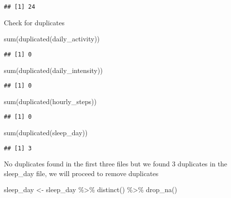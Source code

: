 \documentclass[
]{article}
\newenvironment{Shaded}{\begin{snugshade}}{\end{snugshade}}
\newcommand{\FunctionTok}[1]{\textcolor[rgb]{0.00,0.00,0.00}{#1}}
\newcommand{\NormalTok}[1]{#1}
\newcommand{\OtherTok}[1]{\textcolor[rgb]{0.56,0.35,0.01}{#1}}
\newcommand{\SpecialCharTok}[1]{\textcolor[rgb]{0.00,0.00,0.00}{#1}}
\begin{document}
\begin{verbatim}
## [1] 24
\end{verbatim}

Check for duplicates

\begin{Shaded}
\begin{Highlighting}[]
\FunctionTok{sum}\NormalTok{(}\FunctionTok{duplicated}\NormalTok{(daily\_activity))}
\end{Highlighting}
\end{Shaded}

\begin{verbatim}
## [1] 0
\end{verbatim}

\begin{Shaded}
\begin{Highlighting}[]
\FunctionTok{sum}\NormalTok{(}\FunctionTok{duplicated}\NormalTok{(daily\_intensity))}
\end{Highlighting}
\end{Shaded}

\begin{verbatim}
## [1] 0
\end{verbatim}

\begin{Shaded}
\begin{Highlighting}[]
\FunctionTok{sum}\NormalTok{(}\FunctionTok{duplicated}\NormalTok{(hourly\_steps))}
\end{Highlighting}
\end{Shaded}

\begin{verbatim}
## [1] 0
\end{verbatim}

\begin{Shaded}
\begin{Highlighting}[]
\FunctionTok{sum}\NormalTok{(}\FunctionTok{duplicated}\NormalTok{(sleep\_day))}
\end{Highlighting}
\end{Shaded}

\begin{verbatim}
## [1] 3
\end{verbatim}

No duplicates found in the first three files but we found 3 duplicates
in the sleep\_day file, we will proceed to remove duplicates

\begin{Shaded}
\begin{Highlighting}[]
\NormalTok{sleep\_day }\OtherTok{\textless{}{-}}\NormalTok{ sleep\_day }\SpecialCharTok{\%\textgreater{}\%} 
  \FunctionTok{distinct}\NormalTok{() }\SpecialCharTok{\%\textgreater{}\%} 
  \FunctionTok{drop\_na}\NormalTok{()}
\end{Highlighting}
\end{Shaded}
\end{document}
